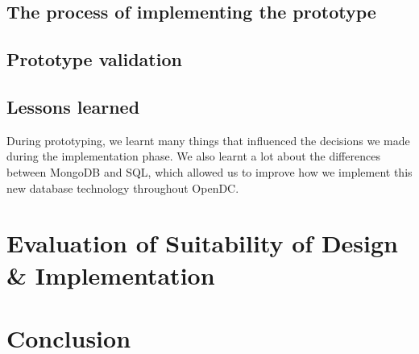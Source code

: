 \documentclass[11pt]{article}
\begin{document}
	\subsection{The process of implementing the prototype}

	\subsection{Prototype validation}

	\subsection{Lessons learned}
		During prototyping, we learnt many things that influenced the decisions we made during the implementation phase.
		We also learnt a lot about the differences between MongoDB and SQL, which allowed us to improve how we implement this new database technology throughout OpenDC.

\section{Evaluation of Suitability of Design \& Implementation}


\section{Conclusion} \label{sec:conclusion}



\end{document}
